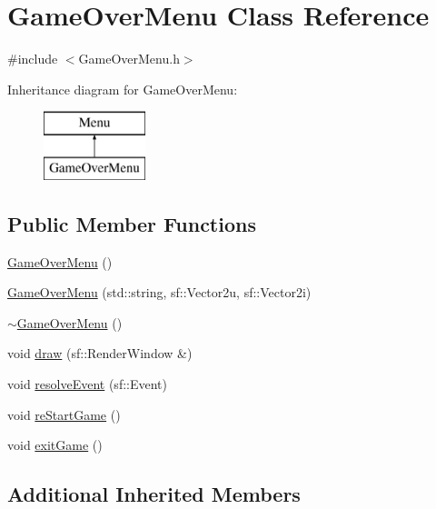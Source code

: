\hypertarget{class_game_over_menu}{\section{Game\+Over\+Menu Class Reference}
\label{class_game_over_menu}
}


{\ttfamily \#include $<$Game\+Over\+Menu.\+h$>$}

Inheritance diagram for Game\+Over\+Menu\+:\begin{figure}[H]
\begin{center}
\leavevmode
\includegraphics[height=2.000000cm]{class_game_over_menu}
\end{center}
\end{figure}
\subsection*{Public Member Functions}
\begin{DoxyCompactItemize}
\item 
\hyperlink{class_game_over_menu_a4dca1c9928485b1c726112992115bbf8}{Game\+Over\+Menu} ()
\item 
\hyperlink{class_game_over_menu_ab290478651ee389837bde740bbc6f3dc}{Game\+Over\+Menu} (std\+::string, sf\+::\+Vector2u, sf\+::\+Vector2i)
\item 
\hyperlink{class_game_over_menu_a4d1cc3861255f9d4f3f6da073259f0f1}{$\sim$\+Game\+Over\+Menu} ()
\item 
void \hyperlink{class_game_over_menu_a5e67d2adec64c94bd880b608c72c4453}{draw} (sf\+::\+Render\+Window \&)
\item 
void \hyperlink{class_game_over_menu_a2b73cda98b30f7c20c5607b6ca8a6915}{resolve\+Event} (sf\+::\+Event)
\item 
void \hyperlink{class_game_over_menu_a1c01e4275b763f83b14301353c873899}{re\+Start\+Game} ()
\item 
void \hyperlink{class_game_over_menu_abb28ebaf2def30a8fc15434639a483e4}{exit\+Game} ()
\end{DoxyCompactItemize}
\subsection*{Additional Inherited Members}


